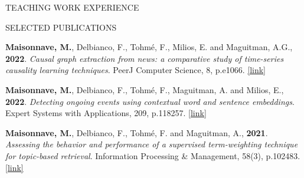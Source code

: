 \documentclass{resume} %
\begin{document}
\begin{rSection}{TEACHING WORK EXPERIENCE}







\end{rSection}


\begin{rSection}{SELECTED PUBLICATIONS}
\item \textbf{Maisonnave, M.}, Delbianco, F., Tohmé, F., Milios, E. and Maguitman, A.G., \textbf{2022}. \textit{Causal graph extraction from news: a comparative study of time-series causality learning techniques}. PeerJ Computer Science, 8, p.e1066. 
\href{https://peerj.com/articles/cs-1066/}{[link]}

\item \textbf{Maisonnave, M.}, Delbianco, F., Tohmé, F., Maguitman, A. and Milios, E., \textbf{2022}. \textit{Detecting ongoing events using contextual word and sentence embeddings}. Expert Systems with Applications, 209, p.118257. 
\href{https://www.sciencedirect.com/science/article/pii/S0957417422013975}{[link]}

\item \textbf{Maisonnave, M.}, Delbianco, F., Tohmé, F. and Maguitman, A., \textbf{2021}. \textit{Assessing the behavior and performance of a supervised term-weighting technique for topic-based retrieval}. Information Processing \& Management, 58(3), p.102483. 
\href{https://www.sciencedirect.com/science/article/pii/S0306457320309729}{[link]}

\end{rSection} 
\end{document}
